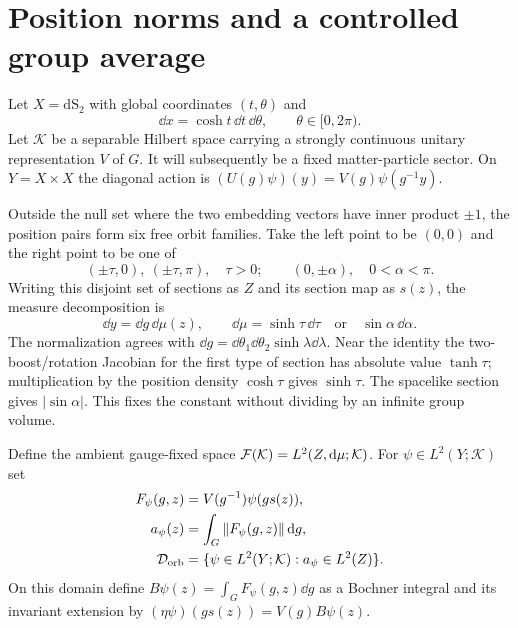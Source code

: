 \section{Position norms and a controlled group average}
\label{sec:orbit}
Let $X=\mathrm{dS}_2$ with global coordinates $(t,\theta)$ and
\begin{equation}
 \dd x=\cosh t\,\dd t\,\dd\theta,\qquad \theta\in[0,2\pi).
\end{equation}
Let $\mathcal K$ be a separable Hilbert space carrying a strongly continuous
unitary representation $V$ of $G$. It will subsequently be a fixed
matter-particle sector. On $Y=X\times X$ the diagonal action is
$(U(g)\psi)(y)=V(g)\psi(g^{-1}y)$.

Outside the null set where the two embedding vectors have inner product
$\pm1$, the position pairs form six free orbit families. Take the left point
to be $(0,0)$ and the right point to be one of
\begin{equation}
 (\pm\tau,0),\ (\pm\tau,\pi),\quad \tau>0;
 \qquad (0,\pm\alpha),\quad 0<\alpha<\pi.
\end{equation}
Writing this disjoint set of sections as $Z$ and its section map as $s(z)$,
the measure decomposition is
\begin{equation}
 \dd y=\dd g\,\dd\mu(z),\qquad
 \dd\mu=\sinh\tau\,\dd\tau\quad\text{or}\quad\sin\alpha\,\dd\alpha.
 \label{eq:coarea}
\end{equation}
The normalization agrees with $\dd g=\dd\theta_1\dd\theta_2
\sinh\lambda\dd\lambda$. Near the identity the two-boost/rotation
Jacobian for the first type of section has absolute value $\tanh\tau$;
multiplication by the position density $\cosh\tau$ gives $\sinh\tau$.
The spacelike section gives $|\sin\alpha|$. This fixes the constant
without dividing by an infinite group volume.

Define the ambient gauge-fixed space $\mathcal F(\mathcal K)=L^2(Z,\mathop{}\!\mathrm d\mu;\mathcal K)$.
For $\psi\in L^2(Y;\mathcal K)$ set
\begin{align}
 F_\psi(g,z)&=V(g^{-1})\psi(gs(z)),\\
 a_\psi(z)&=\int_G\left\lVert F_\psi(g,z)\right\rVert\mathop{}\!\mathrm d g,\\
 \mathcal D_{\mathrm{orb}}&=\{\psi\in L^2(Y;\mathcal K):a_\psi\in L^2(Z)\}.
\end{align}
On this domain define $B\psi(z)=\int_GF_\psi(g,z)\dd g$ as a Bochner
integral and its invariant extension by $(\eta\psi)(gs(z))=V(g)B\psi(z)$.

